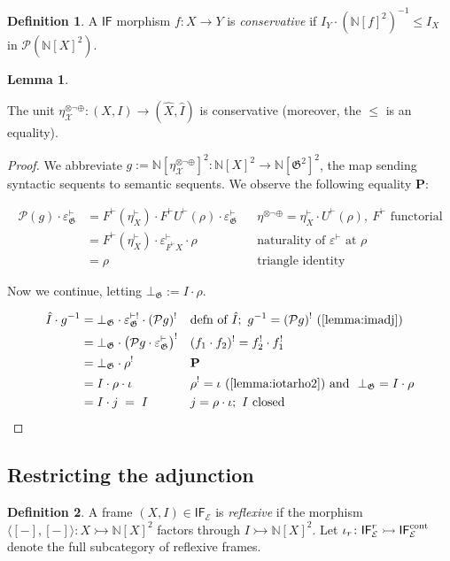 \documentclass{article}
\makeatletter
\newcommand{\allproofs}{} %
\newif\ifproofsinappendix
\newcommand{\lemmawithproof}[3]{%
  \begin{lemma}\label{#1}
    #2  
    \ifproofsinappendix \hyperref[xxx#1]{(Proof)} \fi
  \end{lemma}
    \ifproofsinappendix
  \g@addto@macro\allproofs{%
    \par\medskip
    \noindent
    \subsection*{\cref{#1}}\par
    #2\par
    \begin{proof}\label{xxx#1}
      #3
    \end{proof}%
  }
      \else

    \begin{proof}
      #3
    \end{proof}
    \fi 
}
\theoremstyle{definition}
\newtheorem{definition}{Definition}[section]
\newtheorem{lemma}{Lemma}[section]
\newcommand{\N}{\mathbb{N}}
\newcommand{\G}{\mathfrak{G}}
\newcommand{\cE}{\mathcal{E}}
\newcommand{\cP}{\mathcal{P}}
\newcommand{\cX}{\mathcal{X}}
\newcommand{\cat}[1]{\mathsf{#1}}
\makeatother
\begin{document}
\begin{definition}
    \label{def:cont}
    A $\cat{IF}$ morphism $f\colon X\to Y$ is {\it conservative} if $I_Y\cdot(\N[f]^2)^{-1}\leq I_X$ in $\cP(\N[X]^2)$.
\end{definition}

\lemmawithproof{lemma:cons}{
    The unit $\eta_\cX^{\otimes\neg\oplus}\colon (X,I)\to (\hat X,\hat I)$ is conservative (moreover, the $\leq$ is an equality).
}{
We abbreviate $g:=\N[\eta_\cX^{\otimes\neg\oplus}]^2\colon \N[X]^2\to \N[\G^2]^2$, the map sending syntactic sequents to semantic sequents. We observe the following equality {\bf P}: 

\begin{align*}
\cP(g)\cdot\varepsilon^\vdash_\G
&= F^\vdash(\eta^\vdash_X)\cdot F^\vdash U^\vdash(\rho)\cdot\varepsilon^\vdash_\G
  && \eta^{\otimes\neg\oplus}=\eta^\vdash_X\cdot U^\vdash(\rho),\ F^\vdash\text{ functorial}\\
&= F^\vdash(\eta^\vdash_X)\cdot\varepsilon^\vdash_{F^\vdash X}\cdot\rho
  && \text{naturality of }\varepsilon^\vdash\text{ at }\rho\\
&= \rho && \text{triangle identity}
\end{align*}

Now we continue, letting $\bot_\G:=I\cdot \rho$.

\begin{align*}
\hat I\cdot g^{-1}
&= \bot_\G\cdot\varepsilon^{\vdash!}_\G\cdot(\cP g)^!
  && \text{defn of }\hat I;\ g^{-1}=(\cP g)^!\ \text{(\cref{lemma:imadj})}\\
&= \bot_\G\cdot\big(\cP g\cdot\varepsilon^\vdash_\G\big)^!
  && (f_1\cdot f_2)^!=f_2^!\cdot f_1^!\\
&= \bot_\G\cdot\rho^! && \text{\bf P}\\
&= I\cdot\rho\cdot\iota && \rho^!=\iota \text{ (\cref{lemma:iotarho2}) and }\ \bot_\G=I\cdot\rho\\
&= I\cdot j \;=\; I && j=\rho\cdot\iota;\ I\text{ closed}
\end{align*}

}

\subsection{Restricting the adjunction}

\begin{definition}\label{def:reflframe}
A frame $(X,I)\in\cat{IF}_\cE$ is \emph{reflexive} if the morphism $\langle[-],[-]\rangle\colon X\rightarrowtail \N[X]^2$ factors through $I\rightarrowtail\N[X]^2$. 
Let $\iota_r\colon\cat{IF}^r_\cE\rightarrowtail\cat{IF}^{\rm cont}_\cE$ denote the full subcategory of reflexive frames.
\end{definition}
\end{document}
